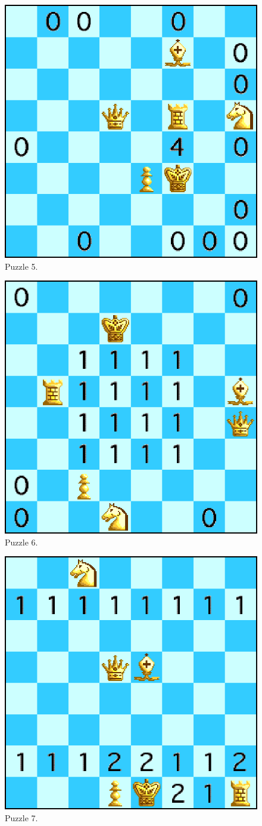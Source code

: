 \documentclass[runningheads]{llncs}
\begin{document}
\begin{figure}[H]
  \centering
  \includegraphics[width=0.6\linewidth]{figures/chess5.eps}
  \caption{Puzzle 5.}\label{fig:puzzle5}
\end{figure}

\begin{figure}[H]
  \centering
  \includegraphics[width=0.6\linewidth]{figures/chess6.eps}
  \caption{Puzzle 6.}\label{fig:puzzle6}
\end{figure}

\begin{figure}[H]
  \centering
  \includegraphics[width=0.6\linewidth]{figures/chess7.eps}
  \caption{Puzzle 7.}\label{fig:puzzle7}
\end{figure}
\end{document}
